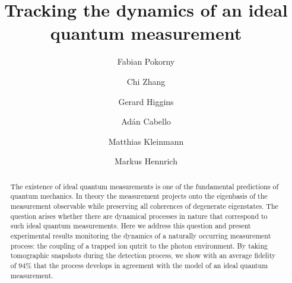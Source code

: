 \documentclass[12pt,
onecolumn,
superscriptaddress,
floatfix,
]{revtex4-2}
\begin{document}

\iftrue
\title{Tracking the dynamics of an ideal quantum measurement}
\else
\title{Tracking the dynamics of an ideal quantum measurement in a trapped-ion 
 fluorescence experiment}
\fi

\author{Fabian Pokorny}

\author{Chi Zhang}

\author{Gerard Higgins}

\author{Adán Cabello}

\author{Matthias Kleinmann}

\author{Markus Hennrich}

\begin{abstract}
The existence of ideal quantum measurements is one of the fundamental predictions of quantum mechanics.
In theory the measurement projects onto the eigenbasis of the measurement observable while preserving all coherences of degenerate eigenstates.
The question arises whether there are dynamical processes in nature that correspond to such ideal quantum measurements.
Here we address this question and present experimental results monitoring the dynamics of a naturally occurring measurement process: the coupling of a trapped ion qutrit to the photon environment.
By taking tomographic snapshots during the detection process, we show with an average fidelity of $94\%$ that the process develops in agreement with the model of an ideal quantum measurement.
\end{abstract}
\end{document}
